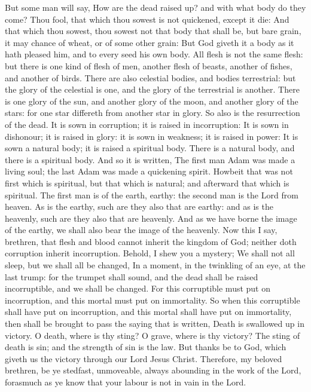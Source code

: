  But some man will say, How are the dead raised up? and
with what body do they come?  Thou fool, that which thou
sowest is not quickened, except it die:  And that which
thou sowest, thou sowest not that body that shall be, but bare grain, it
may chance of wheat, or of some other grain:  But God
giveth it a body as it hath pleased him, and to every seed his own body.
 All flesh is not the same flesh: but there is one kind
of flesh of men, another flesh of beasts, another of fishes, and another
of birds.  There are also celestial bodies, and bodies
terrestrial: but the glory of the celestial is one, and the glory of the
terrestrial is another.  There is one glory of the sun,
and another glory of the moon, and another glory of the stars: for one
star differeth from another star in glory.  So also is
the resurrection of the dead. It is sown in corruption; it is raised in
incorruption:  It is sown in dishonour; it is raised in
glory: it is sown in weakness; it is raised in power:  It
is sown a natural body; it is raised a spiritual body. There is a
natural body, and there is a spiritual body.  And so it
is written, The first man Adam was made a living soul; the last Adam was
made a quickening spirit.  Howbeit that was not first
which is spiritual, but that which is natural; and afterward that which
is spiritual.  The first man is of the earth, earthy: the
second man is the Lord from heaven.  As is the earthy,
such are they also that are earthy: and as is the heavenly, such are
they also that are heavenly.  And as we have borne the
image of the earthy, we shall also bear the image of the heavenly.
 Now this I say, brethren, that flesh and blood cannot
inherit the kingdom of God; neither doth corruption inherit
incorruption.  Behold, I shew you a mystery; We shall not
all sleep, but we shall all be changed,  In a moment, in
the twinkling of an eye, at the last trump: for the trumpet shall sound,
and the dead shall be raised incorruptible, and we shall be changed.
 For this corruptible must put on incorruption, and this
mortal must put on immortality.  So when this corruptible
shall have put on incorruption, and this mortal shall have put on
immortality, then shall be brought to pass the saying that is written,
Death is swallowed up in victory.  O death, where is thy
sting? O grave, where is thy victory?  The sting of death
is sin; and the strength of sin is the law.  But thanks
be to God, which giveth us the victory through our Lord Jesus Christ.
 Therefore, my beloved brethren, be ye stedfast,
unmoveable, always abounding in the work of the Lord, forasmuch as ye
know that your labour is not in vain in the Lord.

